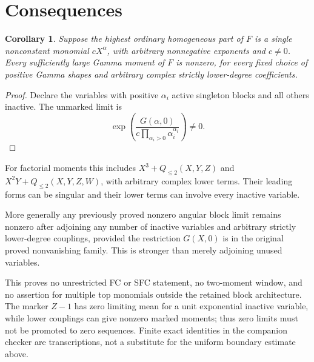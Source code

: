 \documentclass[11pt]{article}
\newtheorem{corollary}{Corollary}
\begin{document}
\section{Consequences}
\begin{corollary}
Suppose the highest ordinary homogeneous part of $F$ is a single
nonconstant monomial $cX^\alpha$, with arbitrary nonnegative exponents
and $c\ne0$. Every sufficiently large Gamma moment of $F$ is nonzero,
for every fixed choice of positive Gamma shapes and arbitrary complex
strictly lower-degree coefficients.
\end{corollary}
\begin{proof}
Declare the variables with positive $\alpha_i$ active singleton blocks
and all others inactive. The unmarked limit is
\[
 \exp\!\left(
 \frac{G(\alpha,0)}{c\prod_{\alpha_i>0}\alpha_i^{\alpha_i}}
 \right)\ne0.
\]
\end{proof}
For factorial moments this includes $X^3+Q_{\le2}(X,Y,Z)$ and
$X^2Y+Q_{\le2}(X,Y,Z,W)$, with arbitrary complex lower terms.
Their leading forms can be singular and their lower terms can involve
every inactive variable.

More generally any previously proved nonzero angular block limit remains
nonzero after adjoining any number of inactive variables and arbitrary
strictly lower-degree couplings, provided the restriction $G(X,0)$ is
in the original proved nonvanishing family. This is stronger than merely
adjoining unused variables.

This proves no unrestricted FC or SFC statement, no two-moment window,
and no assertion for multiple top monomials outside the retained block
architecture. The marker $Z-1$ has zero limiting mean for a unit
exponential inactive variable, while lower couplings can give nonzero
marked moments; thus zero limits must not be promoted to zero sequences.
Finite exact identities in the companion checker are transcriptions,
not a substitute for the uniform boundary estimate above.
\end{document}
